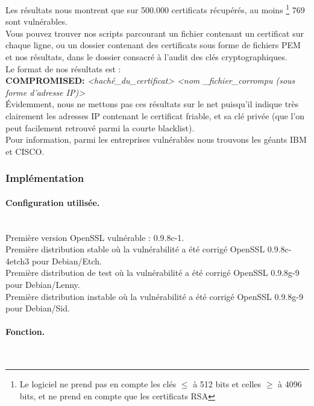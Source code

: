 			Les résultats nous montrent que sur 500.000 certificats récupérés, au moins
			\footnote{Le logiciel ne prend pas en compte les clés $\leq$ à 512 bits et 
			celles $\geq$ à 4096 bits, et ne prend en compte que les certificats RSA} 
			769 sont vulnérables.\\
			
			Vous pouvez trouver nos scripts parcourant un fichier contenant un 
			certificat sur chaque ligne, ou un dossier contenant des certificats sous 
			forme de fichiers PEM et nos résultats, dans le dossier consacré à l'audit des clés
			cryptographiques.\\
			
			Le format de nos résultats est : \\
			
			\textbf{COMPROMISED:} \textit{<haché\_du\_certificat>} \textit{<nom
			\_fichier\_corrompu (sous forme d'adresse IP)>}\\
			
			Évidemment, nous ne mettons pas ces résultats sur le net puisqu'il indique 
			très clairement les adresses IP contenant le certificat friable, et sa clé
			privée (que l'on peut facilement retrouvé parmi la courte blacklist).\\
			
			Pour information, parmi les entreprises vulnérables nous trouvons les géants
			IBM et CISCO.
	
		\subsubsection{Implémentation}
						
			\paragraph{Configuration utilisée.}\\
			
			Première version OpenSSL vulnérable : 0.9.8c-1.\\
			Première distribution stable où la vulnérabilité a été corrigé
			OpenSSL 0.9.8c-4etch3 pour Debian/Etch.\\	
			Première distribution de test où la vulnérabilité a été corrigé
			OpenSSL 0.9.8g-9 pour Debian/Lenny.\\
			Première distribution instable où la vulnérabilité a été corrigé
			OpenSSL 0.9.8g-9 pour Debian/Sid.\\
			
						
			\paragraph{Fonction.} \\
			
